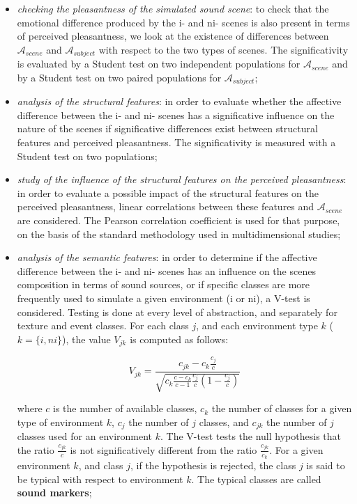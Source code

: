 \documentclass[twoside,twocolumn]{article}
\begin{document}
\begin{itemize}
\item \emph{checking the pleasantness of the simulated sound scene}: to check that the emotional difference produced by the i- and ni- scenes is also present in terms of perceived pleasantness, we look at the existence of differences between $\mathcal{A}_{scene}$ and $\mathcal{A}_{subject}$ with respect to the two types of scenes. The significativity is evaluated by a Student test on two independent populations for $\mathcal{A}_{scene}$ and by a Student test on two paired populations for $\mathcal{A}_{subject}$;
\item \emph{analysis of the structural features}: in order to evaluate whether the affective difference between  the i- and ni- scenes has a significative influence  on the nature of the scenes \ie if significative differences exist between structural features and perceived pleasantness. The significativity is measured with a Student test on two populations;
\item \emph{study of the influence of the structural features on the perceived pleasantness}: in order to evaluate a possible impact of the structural features on the perceived pleasantness, linear correlations between these features and $\mathcal{A}_{scene}$ are considered. The Pearson correlation coefficient is used for that purpose, on the basis of the standard methodology used in multidimensional studies;
\item \emph{analysis of the semantic features}: in order to determine if the affective difference between  the i- and ni- scenes has an influence on the scenes composition in terms of sound sources, or if specific classes are more frequently used to simulate a given environment (i or ni), a V-test is considered. Testing is done at every level of abstraction, and separately for texture and event classes. For each class $j$, and each environment type $k$ ($k=\lbrace i,ni\rbrace$), the value $V_{jk}$ is computed as follows:

\begin{equation*}
V_{jk}=\dfrac{c_{jk}-c_k\frac{c_j}{c}}{\sqrt{c_k\frac{c-c_k}{c-1}\frac{c_j}{c}(1-\frac{c_j}{c})}}
\end{equation*}

where $c$ is the number of available classes, $c_k$ the number of classes for a given type of environment $k$, $c_j$ the number of  $j$ classes, and $c_{jk}$ the number of $j$ classes used for an environment $k$. The V-test tests the null hypothesis that the ratio $\frac{c_{jk}}{c}$ is not significatively different from the ratio $\frac{c_{jk}}{c_k}$. For a given environment $k$, and class $j$, if the hypothesis is rejected, the class $j$ is said to be typical with respect to environment $k$. The typical classes are called \textbf{sound markers};


\end{itemize}
\end{document}
